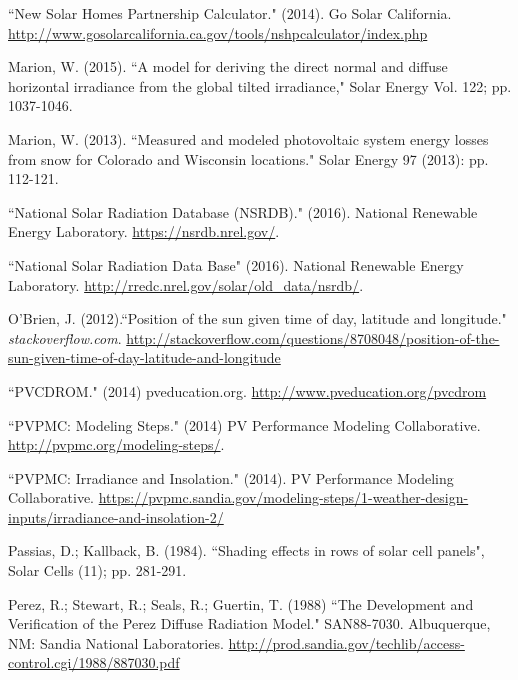 \documentclass[12pt,letterpaper]{article}
\begin{document}
\begin{thebibliography}{99}
 ``New Solar Homes Partnership Calculator." (2014). Go Solar California. \url{http://www.gosolarcalifornia.ca.gov/tools/nshpcalculator/index.php}

 Marion, W. (2015). ``A model for deriving the direct normal and diffuse horizontal irradiance from the global tilted irradiance," Solar Energy Vol. 122; pp. 1037-1046.

 Marion, W. (2013). ``Measured and modeled photovoltaic system energy losses from snow for Colorado and Wisconsin locations." Solar Energy 97 (2013): pp. 112-121.

 ``National Solar Radiation Database (NSRDB)." (2016). National Renewable Energy Laboratory.  \url{https://nsrdb.nrel.gov/}.

 ``National Solar Radiation Data Base" (2016). National Renewable Energy Laboratory. \url{http://rredc.nrel.gov/solar/old_data/nsrdb/}.

 O'Brien, J. (2012).``Position of the sun given time of day, latitude and longitude." \textit{stackoverflow.com}. \url{http://stackoverflow.com/questions/8708048/position-of-the-sun-given-time-of-day-latitude-and-longitude}

 ``PVCDROM." (2014) pveducation.org. \url{http://www.pveducation.org/pvcdrom}

``PVPMC: Modeling Steps." (2014) PV Performance Modeling Collaborative. \url{http://pvpmc.org/modeling-steps/}.

 ``PVPMC: Irradiance and Insolation." (2014). PV Performance Modeling Collaborative. \url{https://pvpmc.sandia.gov/modeling-steps/1-weather-design-inputs/irradiance-and-insolation-2/}

 Passias, D.; Kallback, B.  (1984). ``Shading effects in rows of solar cell panels", Solar Cells (11); pp. 281-291.

 Perez, R.; Stewart, R.; Seals, R.; Guertin, T. (1988) ``The Development and Verification of the Perez Diffuse Radiation Model." SAN88-7030. Albuquerque, NM: Sandia National Laboratories. \url{http://prod.sandia.gov/techlib/access-control.cgi/1988/887030.pdf}


\end{thebibliography}
\end{document}
